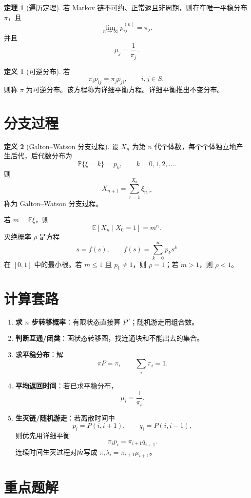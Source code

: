 \documentclass[12pt,a4paper,openany]{ctexrep}
\theoremstyle{definition}
\newtheorem{definition}{定义}[section]
\newtheorem{theorem}{定理}[section]
\newcommand{\E}{\mathbb{E}}
\newcommand{\Pp}{\mathbb{P}}
\begin{document}
\begin{theorem}[遍历定理]
若 Markov 链不可约、正常返且非周期，则存在唯一平稳分布 $\pi$，且
\[
\lim_{n\to\infty}p_{ij}^{(n)}=\pi_j.
\]
并且
\[
\mu_j=\frac1{\pi_j}.
\]
\end{theorem}

\begin{definition}[可逆分布]
若
\[
\pi_i p_{ij}=\pi_jp_{ji},\qquad i,j\in S,
\]
则称 $\pi$ 为可逆分布。该方程称为详细平衡方程。详细平衡推出不变分布。
\end{definition}

\section{分支过程}

\begin{definition}[Galton--Watson 分支过程]
设 $X_n$ 为第 $n$ 代个体数，每个个体独立地产生后代，后代数分布为
\[
\Pp\{\xi=k\}=p_k,\qquad k=0,1,2,\dots.
\]
则
\[
X_{n+1}=\sum_{r=1}^{X_n}\xi_{n,r}
\]
称为 Galton--Watson 分支过程。
\end{definition}

若 $m=\E\xi$，则
\[
\E[X_n\mid X_0=1]=m^n.
\]
灭绝概率 $\rho$ 是方程
\[
s=f(s),\qquad f(s)=\sum_{k=0}^{\infty}p_ks^k
\]
在 $[0,1]$ 中的最小根。若 $m\le1$ 且 $p_1\ne1$，则 $\rho=1$；若 $m>1$，则 $\rho<1$。

\section{计算套路}

\begin{enumerate}[label=\textbf{套路 \arabic*:}]
	\item \textbf{求 $n$ 步转移概率}：有限状态直接算 $P^n$；随机游走用组合数。
	\item \textbf{判断互通/闭类}：画状态转移图，找连通块和不能出去的集合。
	\item \textbf{求平稳分布}：解
	\[
	\pi P=\pi,\qquad \sum_i\pi_i=1.
	\]
	\item \textbf{平均返回时间}：若已求平稳分布，
	\[
	\mu_i=\frac1{\pi_i}.
	\]
	\item \textbf{生灭链/随机游走}：若离散时间中
	\[
	p_i=P(i,i+1),\qquad q_i=P(i,i-1),
	\]
	则优先用详细平衡
	\[
	\pi_i p_i=\pi_{i+1}q_{i+1}.
	\]
	连续时间生灭过程对应写成 $\pi_i\lambda_i=\pi_{i+1}\mu_{i+1}$。
\end{enumerate}

\section{重点题解}
\end{document}
